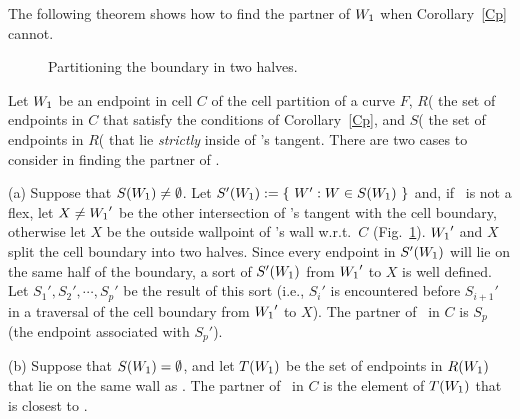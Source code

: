 The following theorem shows how to find the partner of $\mbox{$W_{1}$}$ when 
Corollary~\ref{Cp} cannot.

\begin{figure}[htb]\vspace{2.1in}\caption{Partitioning the boundary in 
two halves.}\label{3.8A}\end{figure}

\begin{theorem}
\label{Tpner}
Let $\mbox{$W_{1}$}$ be an endpoint in cell $C$ of the cell partition of a curve $F$,
$R${\rm (}\wo{\rm )} the set of endpoints
in $C$ that satisfy the conditions of 
Corollary~{\rm \ref{Cp}},
%
and $S${\rm (}\wo{\rm )} 
the set of endpoints in $R${\rm (}\wo{\rm )} that lie {\em strictly} 
inside of \wo's 
tangent.
There are two cases to consider in finding the partner of \wo.

{\rm (a)} Suppose that $S(\mbox{$W_{1}$}) \neq \emptyset$. 
Let \mbox{$S'(\mbox{$W_{1}$}) := \{\ W':W \in S(\mbox{$W_{1}$})\ \}$} and, 
if \wo\ is not a flex, let $X \neq \mbox{$W_{1}$} '$ be the other intersection 
of \wo's 
tangent with the cell boundary, otherwise let $X$ be the outside 
wallpoint of \wo's 
wall w.r.t.\ $C$ {\rm (}Fig.~\ref{3.8A}{\rm )}.
$\mbox{$W_{1}$} '$ and $X$ split the cell boundary into two halves.
Since every endpoint in $S'(\mbox{$W_{1}$})$ will lie on the same half of the boundary,
a sort of $S'(\mbox{$W_{1}$})$ from $\mbox{$W_{1}$} '$ to $X$ is well defined.
Let $S_{1}',S_{2}',\cdots,S_{p}'$ be the result of this sort
{\rm (}i.e., $S_{i}'$ is encountered before $S_{i+1}'$ in a traversal 
of the cell boundary 
from $\mbox{$W_{1}$} '$ to $X${\rm )}.
The partner of \wo\ in $C$ is $S_{p}$ {\rm (}the endpoint associated 
with $S_{p}'${\rm )}.

{\rm (b)} Suppose that $S(\mbox{$W_{1}$}) = \emptyset$, and 
let $T(\mbox{$W_{1}$})$ be the set of endpoints in $R(\mbox{$W_{1}$})$ that lie on 
the same wall as \wo.
The partner of \wo\ in $C$ is the element of $T(\mbox{$W_{1}$})$ that is closest 
to \wo.
\end{theorem}

